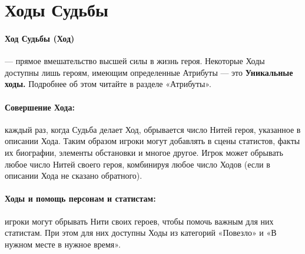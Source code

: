 \section{Ходы Судьбы}
\paragraph{Ход Судьбы (Ход)} — прямое вмешательство высшей силы в жизнь героя. Некоторые Ходы доступны лишь героям, имеющим определенные Атрибуты — это \textbf{Уникальные ходы.} Подробнее об этом читайте в разделе «Атрибуты».
\paragraph{Совершение Хода:} каждый раз, когда Судьба делает Ход, обрывается число Нитей героя, указанное в описании Хода. Таким образом игроки могут добавлять в сцены статистов, факты их биографии, элементы обстановки и многое другое. Игрок может обрывать любое число Нитей своего героя, комбинируя любое число Ходов (если в описании Хода не сказано обратного).
\paragraph{Ходы и помощь персонам и статистам:} игроки могут обрывать Нити своих героев, чтобы помочь важным для них статистам. При этом для них доступны Ходы из категорий «Повезло» и «В нужном месте в нужное время».